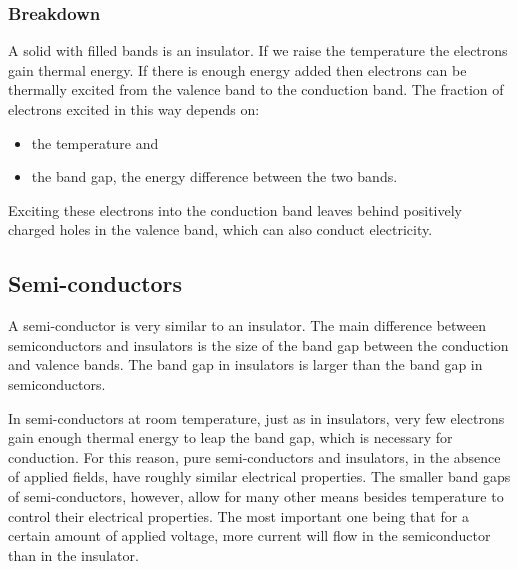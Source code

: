 \subsubsection{Breakdown}

A solid with filled bands is an insulator. If we raise the temperature the electrons gain thermal energy. If there is enough energy added then electrons can be thermally excited from the valence band to the conduction band. The fraction of electrons excited in this way depends on:
\begin{itemize}
\item the temperature and
\item the band gap, the energy difference between the two bands.
\end{itemize}
Exciting these electrons into the conduction band leaves behind positively charged holes in the valence band, which can also conduct electricity.

\subsection{Semi-conductors}

A semi-conductor is very similar to an insulator. The main difference between semiconductors and insulators is the size of the band gap between the conduction and valence bands. The band gap in insulators is larger than the band gap in semiconductors.

In semi-conductors at room temperature, just as in insulators, very few electrons gain enough thermal energy to leap the band gap, which is necessary for conduction. For this reason, pure semi-conductors and insulators, in the absence of applied fields, have roughly similar electrical properties. The smaller band gaps of semi-conductors, however, allow for many other means besides temperature to control their electrical properties. The most important one being that for a certain amount of applied voltage, more current will flow in the semiconductor than in the insulator.

